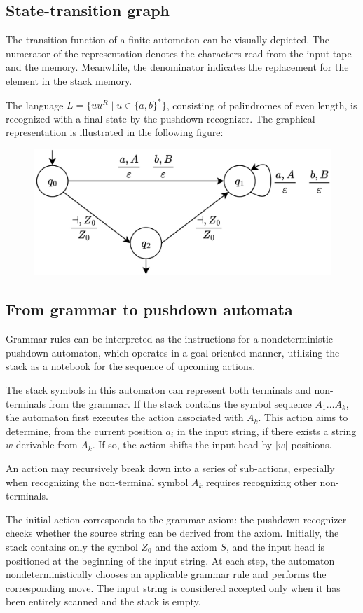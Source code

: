 \subsection{State-transition graph}
The transition function of a finite automaton can be visually depicted. 
The numerator of the representation denotes the characters read from the input tape and the memory. 
Meanwhile, the denominator indicates the replacement for the element in the stack memory.
\begin{example}
    The language $L=\{uu^R\mid u \in \{a,b\}^{\ast}\}$, consisting of palindromes of even length, is recognized with a final state by the pushdown recognizer. 
    The graphical representation is illustrated in the following figure:
    \begin{figure}[H]
        \centering
        \includegraphics[width=0.6\linewidth]{images/pda.png}
    \end{figure}
\end{example}

\subsection{From grammar to pushdown automata}
Grammar rules can be interpreted as the instructions for a nondeterministic pushdown automaton, which operates in a goal-oriented manner, utilizing the stack as a notebook for the sequence of upcoming actions.

The stack symbols in this automaton can represent both terminals and non-terminals from the grammar.
If the stack contains the symbol sequence $A_1 \dots A_k$, the automaton first executes the action associated with $A_k$. 
This action aims to determine, from the current position $a_i$ in the input string, if there exists a string $w$ derivable from $A_k$.
If so, the action shifts the input head by $\left\lvert w\right\rvert$ positions.

An action may recursively break down into a series of sub-actions, especially when recognizing the non-terminal symbol $A_k$ requires recognizing other non-terminals.

The initial action corresponds to the grammar axiom: the pushdown recognizer checks whether the source string can be derived from the axiom.
Initially, the stack contains only the symbol $Z_0$ and the axiom $S$, and the input head is positioned at the beginning of the input string.
At each step, the automaton nondeterministically chooses an applicable grammar rule and performs the corresponding move.
The input string is considered accepted only when it has been entirely scanned and the stack is empty.


